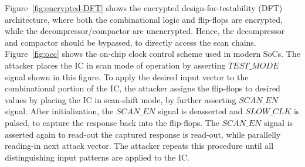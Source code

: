 Figure~\ref{fig:encrypted-DFT} shows the encrypted design-for-testability (DFT) architecture, where both the combinational logic and flip-flops are encrypted, while the decompressor/compactor are unencrypted. 
Hence, the decompressor and compactor should be bypassed, to directly access the scan chains. Figure~\ref{fig:occ} shows the on-chip clock control scheme used in modern SoCs. The attacker places the IC in scan mode of operation by asserting $TEST\_MODE$ signal shown in this figure. To apply the desired input vector to the combinational portion of the IC, the attacker assigns the flip-flops to desired values by placing the IC in scan-shift mode, by further asserting $SCAN\_EN$ signal. After initialization, the $SCAN\_EN$ signal is deasserted and $SLOW\_CLK$ is pulsed, to capture the response back into the flip-flops. The $SCAN\_EN$ signal is asserted again to read-out the captured response is read-out, while parallelly reading-in next attack vector. The attacker repeats this procedure until all distinguishing input patterns are applied to the IC. 

